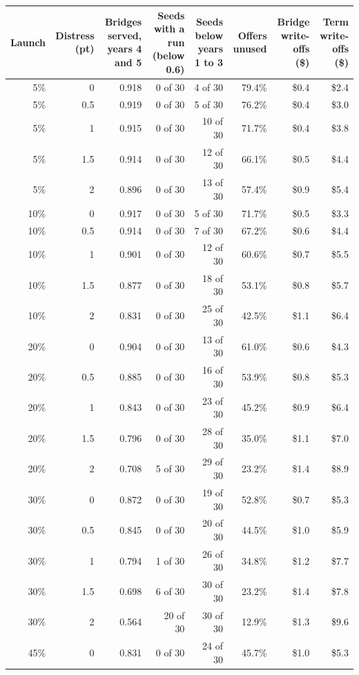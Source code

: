 \begin{tabular}{rrrrrrrr}
\toprule
Launch & Distress (pt) & Bridges served, years 4 and 5 & Seeds with a run (below 0.6) & Seeds below years 1 to 3 & Offers unused & Bridge write-offs (\$) & Term write-offs (\$) \\
\midrule
5\% & 0 & 0.918 & 0 of 30 & 4 of 30 & 79.4\% & \$0.4 & \$2.4 \\
5\% & 0.5 & 0.919 & 0 of 30 & 5 of 30 & 76.2\% & \$0.4 & \$3.0 \\
5\% & 1 & 0.915 & 0 of 30 & 10 of 30 & 71.7\% & \$0.4 & \$3.8 \\
5\% & 1.5 & 0.914 & 0 of 30 & 12 of 30 & 66.1\% & \$0.5 & \$4.4 \\
5\% & 2 & 0.896 & 0 of 30 & 13 of 30 & 57.4\% & \$0.9 & \$5.4 \\
10\% & 0 & 0.917 & 0 of 30 & 5 of 30 & 71.7\% & \$0.5 & \$3.3 \\
10\% & 0.5 & 0.914 & 0 of 30 & 7 of 30 & 67.2\% & \$0.6 & \$4.4 \\
10\% & 1 & 0.901 & 0 of 30 & 12 of 30 & 60.6\% & \$0.7 & \$5.5 \\
10\% & 1.5 & 0.877 & 0 of 30 & 18 of 30 & 53.1\% & \$0.8 & \$5.7 \\
10\% & 2 & 0.831 & 0 of 30 & 25 of 30 & 42.5\% & \$1.1 & \$6.4 \\
20\% & 0 & 0.904 & 0 of 30 & 13 of 30 & 61.0\% & \$0.6 & \$4.3 \\
20\% & 0.5 & 0.885 & 0 of 30 & 16 of 30 & 53.9\% & \$0.8 & \$5.3 \\
20\% & 1 & 0.843 & 0 of 30 & 23 of 30 & 45.2\% & \$0.9 & \$6.4 \\
20\% & 1.5 & 0.796 & 0 of 30 & 28 of 30 & 35.0\% & \$1.1 & \$7.0 \\
20\% & 2 & 0.708 & 5 of 30 & 29 of 30 & 23.2\% & \$1.4 & \$8.9 \\
30\% & 0 & 0.872 & 0 of 30 & 19 of 30 & 52.8\% & \$0.7 & \$5.3 \\
30\% & 0.5 & 0.845 & 0 of 30 & 20 of 30 & 44.5\% & \$1.0 & \$5.9 \\
30\% & 1 & 0.794 & 1 of 30 & 26 of 30 & 34.8\% & \$1.2 & \$7.7 \\
30\% & 1.5 & 0.698 & 6 of 30 & 30 of 30 & 23.2\% & \$1.4 & \$7.8 \\
30\% & 2 & 0.564 & 20 of 30 & 30 of 30 & 12.9\% & \$1.3 & \$9.6 \\
45\% & 0 & 0.831 & 0 of 30 & 24 of 30 & 45.7\% & \$1.0 & \$5.3 \\

\end{tabular}
